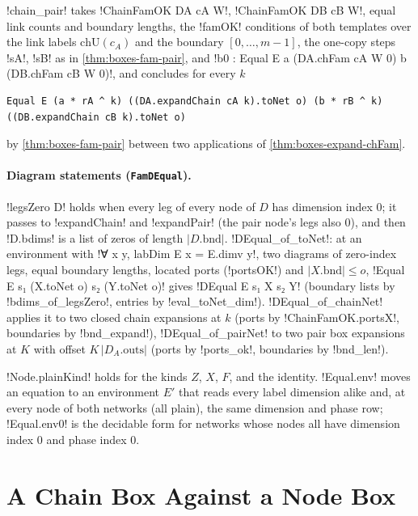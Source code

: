 {\begin{theorem}\label{thm:boxes-chain-pair}
\lbx!chain_pair! takes \lbx!ChainFamOK DA cA W!, \lbx!ChainFamOK DB cB W!, equal link counts and boundary lengths, the \lbx!famOK! conditions of both templates over the link labels $\mathrm{chU}(c_A)$ and the boundary $[0,\ldots,m-1]$, the one-copy steps \lbx!sA!, \lbx!sB! as in \cref{thm:boxes-fam-pair}, and \lbx!b0 : Equal E a (DA.chFam cA W 0) b (DB.chFam cB W 0)!, and concludes for every $k$
\begin{lstlisting}[style=leanbox]
Equal E (a * rA ^ k) ((DA.expandChain cA k).toNet o) (b * rB ^ k) ((DB.expandChain cB k).toNet o)
\end{lstlisting}
by \cref{thm:boxes-fam-pair} between two applications of \cref{thm:boxes-expand-chFam}.
\end{theorem}

\paragraph{Diagram statements (\texttt{FamDEqual}).} \lbx!legsZero D! holds when every leg of
every node of $D$ has dimension index 0; it passes to \lbx!expandChain! and \lbx!expandPair!
(the pair node's legs also 0), and then \lbx!D.bdims! is a list of zeros of length
$|D.\mathrm{bnd}|$. \lbx!DEqual_of_toNet!: at an environment with
\lbx!∀ x y, labDim E x = E.dimv y!, two diagrams of zero-index legs, equal boundary lengths,
located ports (\lbx!portsOK!) and $|X.\mathrm{bnd}| \le o$, \lbx!Equal E s₁ (X.toNet o) s₂ (Y.toNet o)!
gives \lbx!DEqual E s₁ X s₂ Y! (boundary lists by \lbx!bdims_of_legsZero!, entries by
\lbx!eval_toNet_dim!). \lbx!DEqual_of_chainNet! applies it to two closed chain expansions at $k$
(ports by \lbx!ChainFamOK.portsX!, boundaries by \lbx!bnd_expand!), \lbx!DEqual_of_pairNet! to two
pair box expansions at $K$ with offset $K\,|D_A.\mathrm{outs}|$ (ports by \lbx!ports_ok!,
boundaries by \lbx!bnd_len!).

\lbx!Node.plainKind! holds for the kinds $Z$, $X$, $F$, and the identity. \lbx!Equal.env! moves an equation to an environment $E'$ that reads every label dimension alike and, at every node of both networks (all plain), the same dimension and phase row; \lbx!Equal.env0! is the decidable form for networks whose nodes all have dimension index $0$ and phase index $0$.

\section{A Chain Box Against a Node Box}\label{sec:boxes-chainnode}

}
